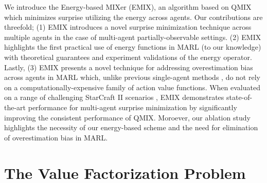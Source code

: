\documentclass{article}
\begin{document}
\begin{multicols}{2}
We introduce the Energy-based MIXer (EMIX), an algorithm based on QMIX which minimizes surprise utilizing the energy across agents. Our contributions are threefold; (1) EMIX introduces a novel surprise minimization technique across multiple agents in the case of multi-agent partially-observable settings. (2) EMIX highlights the first practical use of energy functions in MARL (to our knowledge) with theoretical guarantees and experiment validations of the energy operator. Lastly, (3) EMIX presents a novel technique for addressing overestimation bias across agents in MARL which, unlike previous single-agent methods \cite{maxmin}, do not rely on a computationally-expensive family of action value functions. When evaluated on a range of challenging StarCraft II scenarios \cite{smac}, EMIX demonstrates state-of-the-art performance for multi-agent surprise minimization by significantly improving the consistent performance of QMIX. Moroever, our ablation study highlights the necessity of our energy-based scheme and the need for elimination of overestimation bias in MARL.



\section{The Value Factorization Problem}

\end{multicols}
\end{document}
